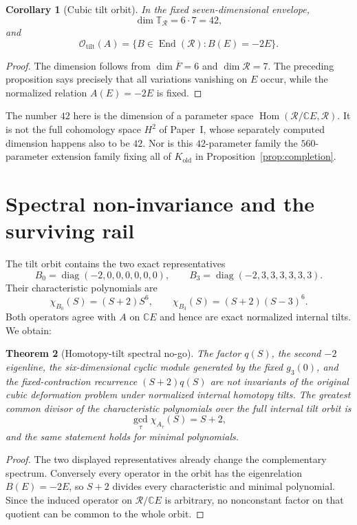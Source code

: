 \documentclass[11pt]{amsart}
\newtheorem{theorem}{Theorem}[section]
\newtheorem{corollary}[theorem]{Corollary}
\newcommand{\C}{\mathbb C}
\newcommand{\End}{\operatorname{End}}
\newcommand{\Hom}{\operatorname{Hom}}
\begin{document}
\begin{corollary}[Cubic tilt orbit]
In the fixed seven-dimensional envelope,
\[
\dim\mathbb T_{\mathcal R}=6\cdot7=42,
\]
and
\[
\boxed{
\mathcal O_{\mathrm{tilt}}(A)
=\{B\in\End(\mathcal R):B(E)=-2E\}.}
\]
\end{corollary}

\begin{proof}
The dimension follows from \(\dim\overline F=6\) and \(\dim\mathcal R=7\).  The preceding proposition says precisely that all variations vanishing on \(E\) occur, while the normalized relation \(A(E)=-2E\) is fixed.
\end{proof}

The number $42$ here is the dimension of a parameter space
$\Hom(\mathcal R/\C E,\mathcal R)$. It is not the full cohomology space
$H^2$ of Paper~I, whose separately computed dimension happens also to be $42$.
Nor is this $42$-parameter family the $560$-parameter extension family fixing
all of $K_{\mathrm{old}}$ in Proposition~\ref{prop:completion}.

\section{Spectral non-invariance and the surviving rail}

The tilt orbit contains the two exact representatives
\[
B_0=\operatorname{diag}(-2,0,0,0,0,0,0),
\qquad
B_3=\operatorname{diag}(-2,3,3,3,3,3,3).
\]
Their characteristic polynomials are
\[
\chi_{B_0}(S)=(S+2)S^6,
\qquad
\chi_{B_3}(S)=(S+2)(S-3)^6.
\]
Both operators agree with \(A\) on \(\C E\) and hence are exact normalized internal tilts.  We obtain:

\begin{theorem}[Homotopy-tilt spectral no-go]
The factor \(q(S)\), the second \(-2\) eigenline, the six-dimensional cyclic module generated by the fixed \(g_3(0)\), and the fixed-contraction recurrence \((S+2)q(S)\) are not invariants of the original cubic deformation problem under normalized internal homotopy tilts.  The greatest common divisor of the characteristic polynomials over the full internal tilt orbit is
\[
\gcd_{\tau}\chi_{A_\tau}(S)=S+2,
\]
and the same statement holds for minimal polynomials.
\end{theorem}

\begin{proof}
The two displayed representatives already change the complementary spectrum.  Conversely every operator in the orbit has the eigenrelation \(B(E)=-2E\), so \(S+2\) divides every characteristic and minimal polynomial.  Since the induced operator on \(\mathcal R/\C E\) is arbitrary, no nonconstant factor on that quotient can be common to the whole orbit.
\end{proof}
\end{document}

